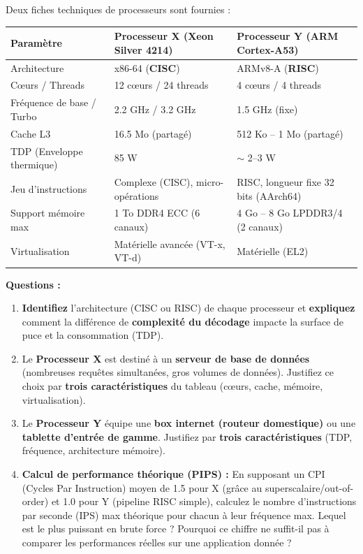 \documentclass[11pt]{article}
\begin{document}
\begin{exercice}
Deux fiches techniques de processeurs sont fournies :

\begin{center}
\begin{tabularx}{\linewidth}{|l|X|X|}
\hline
\rowcolor{popblueL}
\textbf{Paramètre} & \textbf{Processeur X (Xeon Silver 4214)} & \textbf{Processeur Y (ARM Cortex-A53)} \\
\hline
Architecture & x86-64 (\textbf{CISC}) & ARMv8-A (\textbf{RISC}) \\
\hline
Cœurs / Threads & 12 cœurs / 24 threads & 4 cœurs / 4 threads \\
\hline
Fréquence de base / Turbo & 2.2 GHz / 3.2 GHz & 1.5 GHz (fixe) \\
\hline
Cache L3 & 16.5 Mo (partagé) & 512 Ko -- 1 Mo (partagé) \\
\hline
TDP (Enveloppe thermique) & 85 W & $\sim$ 2--3 W \\
\hline
Jeu d'instructions & Complexe (CISC), micro-opérations & RISC, longueur fixe 32 bits (AArch64) \\
\hline
Support mémoire max & 1 To DDR4 ECC (6 canaux) & 4 Go -- 8 Go LPDDR3/4 (2 canaux) \\
\hline
Virtualisation & Matérielle avancée (VT-x, VT-d) & Matérielle (EL2) \\
\hline
\end{tabularx}
\end{center}

\textbf{Questions :}
\begin{enumerate}
    \item \textbf{Identifiez} l'architecture (CISC ou RISC) de chaque processeur et \textbf{expliquez} comment la différence de \textbf{complexité du décodage} impacte la surface de puce et la consommation (TDP).
    \item Le \textbf{Processeur X} est destiné à un \textbf{serveur de base de données} (nombreuses requêtes simultanées, gros volumes de données). Justifiez ce choix par \textbf{trois caractéristiques} du tableau (cœurs, cache, mémoire, virtualisation).
    \item Le \textbf{Processeur Y} équipe une \textbf{box internet (routeur domestique)} ou une \textbf{tablette d'entrée de gamme}. Justifiez par \textbf{trois caractéristiques} (TDP, fréquence, architecture mémoire).
    \item \textbf{Calcul de performance théorique (PIPS) :} En supposant un CPI (Cycles Par Instruction) moyen de 1.5 pour X (grâce au superscalaire/out-of-order) et 1.0 pour Y (pipeline RISC simple), calculez le nombre d'instructions par seconde (IPS) max théorique pour chacun à leur fréquence max. Lequel est le plus puissant en brute force ? Pourquoi ce chiffre ne suffit-il pas à comparer les performances réelles sur une application donnée ?
\end{enumerate}
\end{exercice}
\end{document}
